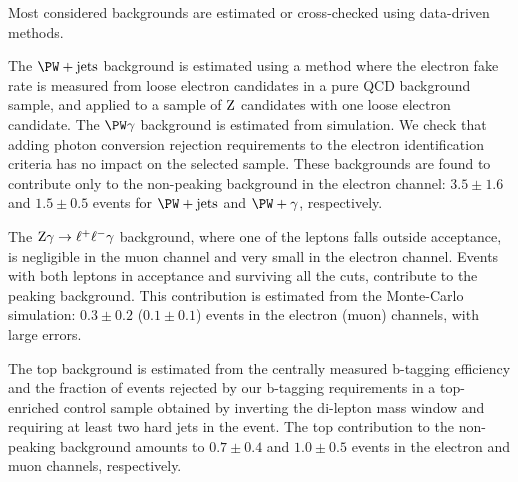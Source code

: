 Most considered backgrounds are estimated or cross-checked using data-driven methods. 

The $\PW+\mathrm{jets}$ background is estimated using a method where the electron fake rate is measured from loose electron candidates in a pure QCD background sample, and applied to a sample of $\mathrm{Z}$ candidates with one loose electron candidate. The $\PW\gamma$ background is estimated from simulation. We check that adding photon conversion rejection requirements to the electron identification criteria has no impact on the selected sample. These backgrounds are found to contribute only to the non-peaking background in the electron channel: $3.5\pm1.6$ and $1.5\pm0.5$ events for $\PW+\mathrm{jets}$ and $\PW+\gamma$, respectively. 

The $\mathrm{Z}\gamma\to\ell^+\ell^-\gamma$ background, where one of the leptons falls outside acceptance, is negligible in the muon channel and very small in the electron channel. Events with both leptons in acceptance and surviving all the cuts, contribute to the peaking background. This contribution is estimated from the Monte-Carlo simulation: $0.3\pm0.2$  ($0.1\pm0.1$) events in the electron (muon) channels, with large errors.  

The top background is estimated from the centrally measured b-tagging efficiency and the fraction of events rejected by our b-tagging requirements in a top-enriched control sample obtained by inverting the di-lepton mass window and requiring at least two hard jets in the event. The top contribution to the non-peaking background amounts to $0.7\pm0.4$ and $1.0\pm0.5$ events in the electron and muon channels, respectively. 


